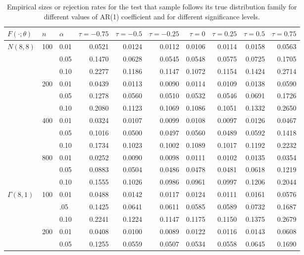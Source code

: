 \documentclass[APA,Times1COL]{WileyNJDv5} %
\begin{document}
\begin{table}[tbp]
\centering
\caption{Empirical sizes or rejection rates
for the test that sample follows its true distribution family for
different values of AR(1) coefficient and for different 
significance levels.}
\label{table:size}
\begin{tabular}{lllrrrrrrr}
  \toprule
$F(\cdot; \theta)$ & $n$ & $\alpha$ & $\tau = -0.75$ & $\tau = -0.5$ & $\tau = -0.25$ 
& $\tau = 0$ & $\tau = 0.25$ & $\tau = 0.5$ & $\tau = 0.75$ \\ 
  \midrule
{$N(8,8)$} & {100} & 0.01 & 0.0521 & 0.0124 & 0.0112 & 0.0106 & 0.0114 & 0.0158 & 0.0563 \\ 
& & 0.05 & 0.1470 & 0.0628 & 0.0545 & 0.0548 & 0.0575 & 0.0725 & 0.1705 \\ 
& & 0.10 & 0.2277 & 0.1186 & 0.1147 & 0.1072 & 0.1154 & 0.1424 & 0.2714 \\ 
& {200} & 0.01 & 0.0439 & 0.0113 & 0.0090 & 0.0114 & 0.0109 & 0.0138 & 0.0590 \\ 
& & 0.05 & 0.1278 & 0.0560 & 0.0510 & 0.0532 & 0.0546 & 0.0691 & 0.1726 \\ 
& & 0.10 & 0.2080 & 0.1123 & 0.1069 & 0.1086 & 0.1051 & 0.1332 & 0.2650 \\ 
& {400} & 0.01 & 0.0324 & 0.0107 & 0.0099 & 0.0108 & 0.0097 & 0.0126 & 0.0467 \\ 
& & 0.05 & 0.1016 & 0.0500 & 0.0497 & 0.0560 & 0.0489 & 0.0592 & 0.1418 \\ 
& & 0.10 & 0.1734 & 0.1023 & 0.1002 & 0.1089 & 0.1017 & 0.1192 & 0.2232 \\ 
& {800} & 0.01 & 0.0252 & 0.0090 & 0.0098 & 0.0111 & 0.0102 & 0.0135 & 0.0354 \\ 
& & 0.05 & 0.0883 & 0.0504 & 0.0486 & 0.0478 & 0.0481 & 0.0618 & 0.1219 \\ 
& & 0.10 & 0.1555 & 0.1026 & 0.0986 & 0.0961 & 0.0997 & 0.1206 & 0.2044 \\ [1ex]
{$\Gamma(8,1)$} & {100} & 0.01 & 0.0488 & 0.0142 & 0.0117 & 0.0124 & 0.0111 & 0.0161 & 0.0576 \\ 
  & & .05 & 0.1425 & 0.0641 & 0.0611 & 0.0585 & 0.0589 & 0.0732 & 0.1687 \\ 
  & & 0.10 & 0.2241 & 0.1224 & 0.1147 & 0.1175 & 0.1150 & 0.1375 & 0.2679 \\ 
  & {200} & 0.01 & 0.0408 & 0.0100 & 0.0089 & 0.0122 & 0.0116 & 0.0143 & 0.0608 \\ 
  & & 0.05 & 0.1255 & 0.0559 & 0.0507 & 0.0534 & 0.0558 & 0.0645 & 0.1690 \\ 

\end{tabular}
\end{table}
\end{document}
